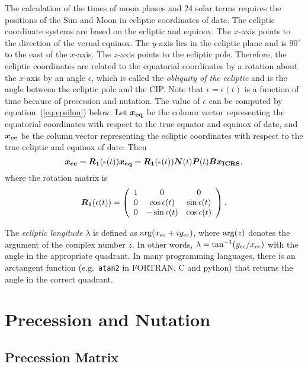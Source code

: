 \documentclass[12pt]{article}
\newcommand \beq {\begin{equation}}
\newcommand \eeq {\end{equation}}
\newcommand{\ve}[1]{\mbox{\boldmath $#1$}}
\begin{document}
\begin{CJK}{UTF8}{bkai}
The calculation of the times of moon phases and 24 solar terms requires the positions of 
the Sun and Moon in ecliptic coordinates of date. The ecliptic 
coordinate systems are based on the ecliptic and equinox. 
The $x$-axis points to the direction of the vernal equinox. 
The $y$-axis lies in the ecliptic plane and is $90^\circ$ 
to the east of the $x$-axis. The $z$-axis points to the 
ecliptic pole. Therefore, the ecliptic coordinates are 
related to the equatorial coordinates by a rotation about 
the $x$-axis by an angle $\epsilon$, which is called the 
{\it obliquity of the ecliptic} and is the angle between 
the ecliptic pole and the CIP. Note that $\epsilon=\epsilon(t)$ is a function of 
time because of precession and nutation. The value of $\epsilon$ can be 
computed by equation~(\ref{eq:epsilon}) below. Let $\ve{x_{\rm eq}}$ be 
the column vector representing the equatorial coordinates 
with respect to the true equator and equinox of date, and $\ve{x_{\rm ec}}$ 
be the column vector representing the ecliptic coordinates 
with respect to the true ecliptic and equinox of date. Then 
\beq
  \ve{x_{\rm ec}} = \ve{R_1}(\epsilon(t)) \ve{x_{\rm eq}} 
= \ve{R_1}(\epsilon(t)) \ve{N}(t) \ve{P}(t) \ve{B} \ve{x_{\rm ICRS}} ,
\label{eq:ICRS2EC}
\eeq
where the rotation matrix is 
\beq
  \ve{R_1}(\epsilon(t)) = \left( \begin{array}{ccc}
1 & 0 & 0 \\
0 & \cos \epsilon(t) & \sin \epsilon(t) \\
0 & -\sin \epsilon(t) & \cos \epsilon(t) \end{array} \right) .
\label{eq:matrixR1}
\eeq

The {\em ecliptic longitude} $\lambda$ is defined as ${\rm arg}(x_{\rm ec} + i y_{\rm ec})$, 
where ${\rm arg}(z)$ denotes the argument of the complex number $z$. 
In other words, $\lambda = \tan^{-1} (y_{\rm ec}/x_{\rm ec})$ with the 
angle in the appropriate quadrant. In many programming languages, there is 
an arctangent function (e.g.\ {\tt atan2} in FORTRAN, C and python) that returns the angle 
in the correct quadrant.

\section{Precession and Nutation}
\label{sec:precessionNutation}

\subsection{Precession Matrix}


\end{CJK}
\end{document}
